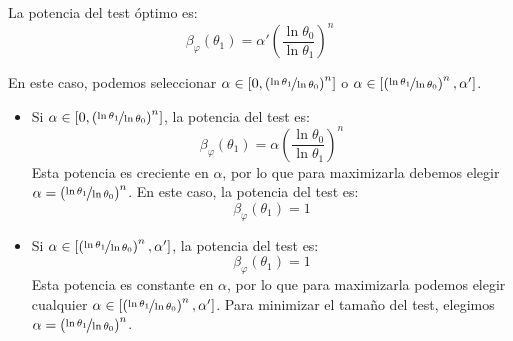 \begin{ejercicio}
\begin{description}
\begin{description}
            La potencia del test óptimo es:
            \begin{equation*}
                \beta_\varphi(\theta_1) = \alpha'\left(\frac{\ln \theta_0}{\ln \theta_1}\right)^n
            \end{equation*}

            \item[Subcaso $\alpha' > \left(\nicefrac{\ln \theta_1}{\ln \theta_0}\right)^n$.] En este caso, podemos seleccionar $\alpha \in \left[0, \left(\nicefrac{\ln \theta_1}{\ln \theta_0}\right)^n\right]$ o $\alpha \in \left[\left(\nicefrac{\ln \theta_1}{\ln \theta_0}\right)^n, \alpha'\right]$.
            \begin{itemize}
                \item Si $\alpha \in \left[0, \left(\nicefrac{\ln \theta_1}{\ln \theta_0}\right)^n\right]$, la potencia del test es:
                \begin{equation*}
                    \beta_\varphi(\theta_1) = \alpha\left(\frac{\ln \theta_0}{\ln \theta_1}\right)^n
                \end{equation*}
                Esta potencia es creciente en $\alpha$, por lo que para maximizarla debemos elegir $\alpha = \left(\nicefrac{\ln \theta_1}{\ln \theta_0}\right)^n$. En este caso, la potencia del test es:
                \begin{equation*}
                    \beta_\varphi(\theta_1) = 1
                \end{equation*}
                \item Si $\alpha \in \left[\left(\nicefrac{\ln \theta_1}{\ln \theta_0}\right)^n, \alpha'\right]$, la potencia del test es:
                \begin{equation*}
                    \beta_\varphi(\theta_1) = 1
                \end{equation*}
                Esta potencia es constante en $\alpha$, por lo que para maximizarla podemos elegir cualquier $\alpha \in \left[\left(\nicefrac{\ln \theta_1}{\ln \theta_0}\right)^n, \alpha'\right]$. Para minimizar el tamaño del test, elegimos $\alpha = \left(\nicefrac{\ln \theta_1}{\ln \theta_0}\right)^n$.
            \end{itemize}


\end{description}
\end{description}
\end{ejercicio}
